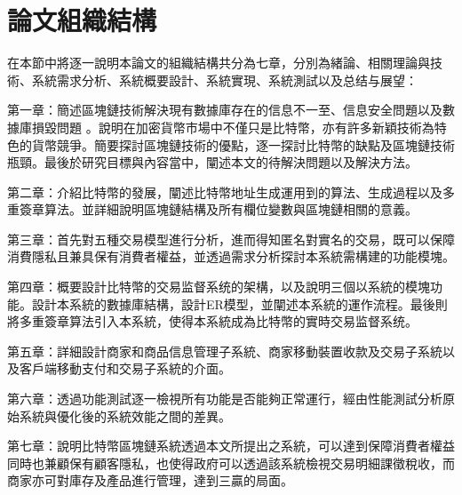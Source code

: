 	\section{論文組織結構}
	在本節中將逐一說明本論文的組織結構共分為七章，分別為緒論、相關理論與技術、系統需求分析、系統概要設計、系統實現、系統測試以及总结与展望：

	第一章：簡述區塊鏈技術解決現有數據庫存在的信息不一至、信息安全問題以及數據庫損毀問題
	。說明在加密貨幣市場中不僅只是比特幣，亦有許多新穎技術為特色的貨幣競爭。簡要探討區塊鏈技術的優點，逐一探討比特幣的缺點及區塊鏈技術瓶頸。最後於研究目標與內容當中，闡述本文的待解決問題以及解決方法。

	第二章：介紹比特幣的發展，闡述比特幣地址生成運用到的算法、生成過程以及多重簽章算法。並詳細說明區塊鏈結構及所有欄位變數與區塊鏈相關的意義。

	第三章：首先對五種交易模型進行分析，進而得知匿名對實名的交易，既可以保障消費隱私且兼具保有消費者權益，並透過需求分析探討本系統需構建的功能模塊。

	第四章：概要設計比特幣的交易监督系统的架構，以及說明三個以系統的模塊功能。設計本系統的數據庫結構，設計ER模型，並闡述本系統的運作流程。最後則將多重簽章算法引入本系統，使得本系統成為比特幣的實時交易监督系统。

	第五章：詳細設計商家和商品信息管理子系統、商家移動裝置收款及交易子系統以及客戶端移動支付和交易子系統的介面。

	第六章：透過功能測試逐一檢視所有功能是否能夠正常運行，經由性能測試分析原始系統與優化後的系統效能之間的差異。

	第七章：說明比特幣區塊鏈系統透過本文所提出之系統，可以達到保障消費者權益同時也兼顧保有顧客隱私，也使得政府可以透過該系統檢視交易明細課徵稅收，而商家亦可對庫存及產品進行管理，達到三贏的局面。
